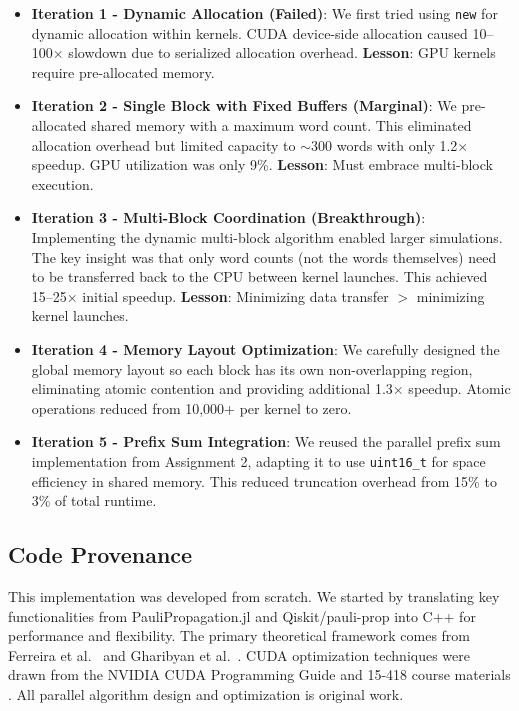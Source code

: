 \documentclass[11pt, a4paper]{article}
\begin{document}
\begin{itemize}
    \item \textbf{Iteration 1 - Dynamic Allocation (Failed)}: We first tried using \texttt{new} for dynamic allocation within kernels. CUDA device-side allocation caused 10--100$\times$ slowdown due to serialized allocation overhead. \textbf{Lesson}: GPU kernels require pre-allocated memory.
    \item \textbf{Iteration 2 - Single Block with Fixed Buffers (Marginal)}: We pre-allocated shared memory with a maximum word count. This eliminated allocation overhead but limited capacity to $\sim$300 words with only 1.2$\times$ speedup. GPU utilization was only 9\%. \textbf{Lesson}: Must embrace multi-block execution.
    \item \textbf{Iteration 3 - Multi-Block Coordination (Breakthrough)}: Implementing the dynamic multi-block algorithm enabled larger simulations. The key insight was that only word counts (not the words themselves) need to be transferred back to the CPU between kernel launches. This achieved 15--25$\times$ initial speedup. \textbf{Lesson}: Minimizing data transfer $>$ minimizing kernel launches.
    \item \textbf{Iteration 4 - Memory Layout Optimization}: We carefully designed the global memory layout so each block has its own non-overlapping region, eliminating atomic contention and providing additional 1.3$\times$ speedup. Atomic operations reduced from 10,000+ per kernel to zero.
    \item \textbf{Iteration 5 - Prefix Sum Integration}: We reused the parallel prefix sum implementation from Assignment 2, adapting it to use \texttt{uint16\_t} for space efficiency in shared memory. This reduced truncation overhead from 15\% to 3\% of total runtime.
\end{itemize}
\subsection{Code Provenance}

This implementation was developed from scratch. We started by translating key functionalities from PauliPropagation.jl \cite{rudolph2024} and Qiskit/pauli-prop \cite{qiskit2024} into C++ for performance and flexibility. The primary theoretical framework comes from Ferreira et al.\ \cite{ferreira2020} and Gharibyan et al.\ \cite{gharibyan2025}. CUDA optimization techniques were drawn from the NVIDIA CUDA Programming Guide \cite{nvidia2024} and 15-418 course materials \cite{cmu418}. All parallel algorithm design and optimization is original work.
\end{document}
